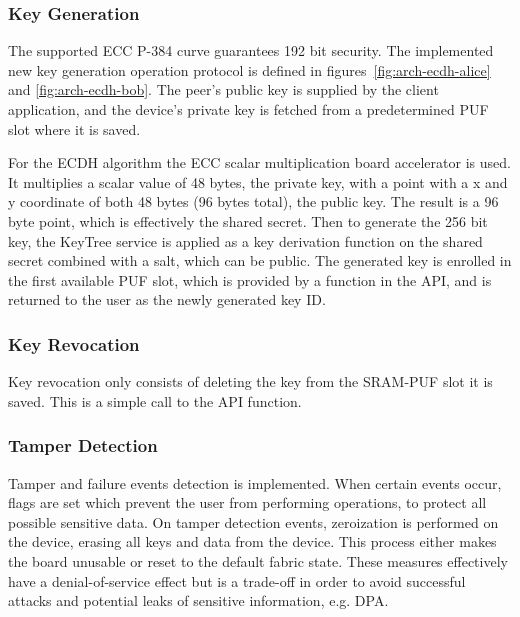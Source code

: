 
\subsubsection*{Key Generation}
The supported \ac{ECC} P-384 curve guarantees 192 bit security.
The implemented new key generation operation protocol is defined in figures~\ref{fig:arch-ecdh-alice} and \ref{fig:arch-ecdh-bob}.
The peer's public key is supplied by the client application, and the device's private key is fetched from a predetermined PUF slot where it is saved.

For the ECDH algorithm the ECC scalar multiplication board accelerator is used. It multiplies a scalar value of 48 bytes, the private key, with a point with a x and y coordinate of both 48 bytes (96 bytes total), the public key.
The result is a 96 byte point, which is effectively the shared secret.
Then to generate the 256 bit key, the KeyTree service is applied as a key derivation function on the shared secret combined with a salt, which can be public.
The generated key is enrolled in the first available PUF slot, which is provided by a function in the API, and is returned to the user as the newly generated key ID.

\subsubsection*{Key Revocation}
Key revocation only consists of deleting the key from the SRAM-PUF slot it is saved. This is a simple call to the API function.

\subsubsection*{Tamper Detection}

Tamper and failure events detection is implemented. When certain events occur, flags are set which prevent the user from performing operations, to protect all possible sensitive data.
On tamper detection events, zeroization is performed on the device, erasing all keys and data from the device. This process either makes the board unusable or reset to the default fabric state.
These measures effectively have a denial-of-service effect but is a trade-off in order to avoid successful attacks and potential leaks of sensitive information, e.g. \ac{DPA}.

